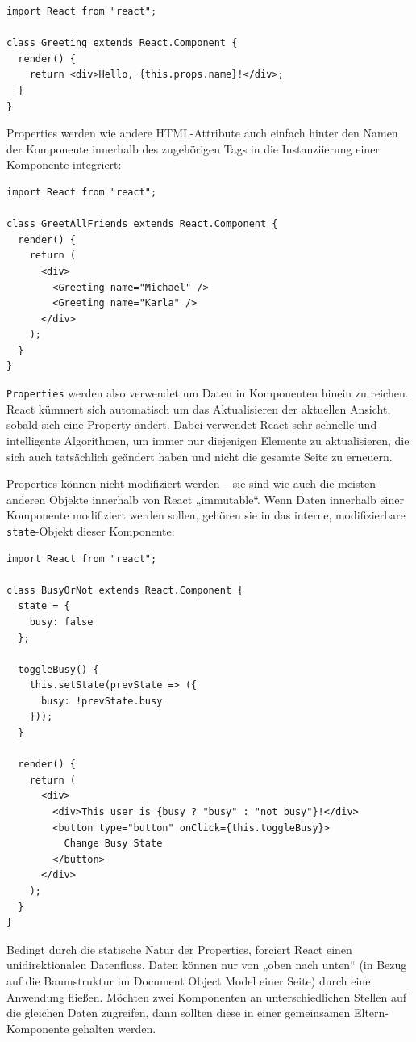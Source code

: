 \begin{lstlisting}
import React from "react";

class Greeting extends React.Component {
  render() {
    return <div>Hello, {this.props.name}!</div>;
  }
}
\end{lstlisting}

Properties werden wie andere HTML-Attribute auch einfach hinter den Namen der Komponente innerhalb des zugehörigen Tags in die Instanziierung einer Komponente integriert:

\begin{lstlisting}
import React from "react";

class GreetAllFriends extends React.Component {
  render() {
    return (
      <div>
        <Greeting name="Michael" />
        <Greeting name="Karla" />
      </div>
    );
  }
}
\end{lstlisting}

\texttt{Properties} werden also verwendet um Daten in Komponenten hinein zu reichen. React kümmert sich automatisch um das Aktualisieren der aktuellen Ansicht, sobald sich eine Property ändert. Dabei verwendet React sehr schnelle und intelligente Algorithmen, um immer nur diejenigen Elemente zu aktualisieren, die sich auch tatsächlich geändert haben und nicht die gesamte Seite zu erneuern.

Properties können nicht modifiziert werden – sie sind wie auch die meisten anderen Objekte innerhalb von React „immutable“. Wenn Daten innerhalb einer Komponente modifiziert werden sollen, gehören sie in das interne, modifizierbare \texttt{state}-Objekt dieser Komponente:

\begin{lstlisting}
import React from "react";

class BusyOrNot extends React.Component {
  state = {
    busy: false
  };

  toggleBusy() {
    this.setState(prevState => ({
      busy: !prevState.busy
    }));
  }

  render() {
    return (
      <div>
        <div>This user is {busy ? "busy" : "not busy"}!</div>
        <button type="button" onClick={this.toggleBusy}>
          Change Busy State
        </button>
      </div>
    );
  }
}
\end{lstlisting}
Bedingt durch die statische Natur der Properties, forciert React einen unidirektionalen Datenfluss. Daten können nur von „oben nach unten“ (in Bezug auf die Baumstruktur im Document Object Model einer Seite) durch eine Anwendung fließen. Möchten zwei Komponenten an unterschiedlichen Stellen auf die gleichen Daten zugreifen, dann sollten diese in einer gemeinsamen Eltern-Komponente gehalten werden. \newline

